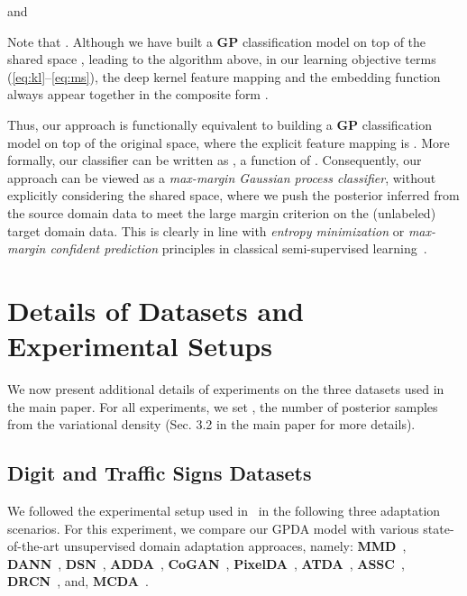 \documentclass[10pt,letterpaper]{article}
\begin{document}
and

Note that . 
Although we have built a \textbf {GP} classification model on top of the shared space , leading to the algorithm above,  in our learning objective terms  (\ref{eq:kl}--\ref{eq:ms}), the deep kernel feature mapping  and the embedding function  always appear together in the composite form . 

Thus, our approach is functionally equivalent to building a \textbf {GP} classification model on top of the original  space, where the explicit feature mapping is . More formally, our classifier can be written as , a function of .
Consequently, our approach can be viewed as a {\em max-margin Gaussian process classifier}, without explicitly considering the shared space, where we push the posterior inferred from the source domain data to meet the large margin criterion on the (unlabeled) target domain data. This is clearly in line with {\em entropy minimization} or {\em max-margin confident prediction} principles in classical semi-supervised learning~\cite{ssem04,semisup_book}.

\section{Details of Datasets and Experimental Setups}\label{sec:datasets}
We now present additional details of experiments on the three datasets used in the main paper. For all experiments, we set , the number of posterior samples from the variational density  (Sec. 3.2 in the main paper for more details). 
\subsection{Digit and Traffic Signs Datasets}
We followed the experimental setup used in~\cite{ganin2014unsupervised} in the following three adaptation scenarios. For this experiment, we compare our GPDA model with various state-of-the-art unsupervised domain adaptation approaces, namely: \textbf{MMD}~\cite{long2015learning}, \textbf{DANN}~\cite{ganin2014unsupervised}, \textbf{DSN}~\cite{bousmalis2016domain}, \textbf{ADDA}~\cite{tzeng2017adversarial},
\textbf{CoGAN}~\cite{NIPS2016_6544},
\textbf{PixelDA}~\cite{bousmalis2017unsupervised},
\textbf{ATDA}~\cite{saito2017asymmetric},
\textbf{ASSC}~\cite{haeusser2017associative},
\textbf{DRCN}~\cite{ghifary2016deep},
and, \textbf{MCDA}~\cite{saito2018}.\\
\end{document}
